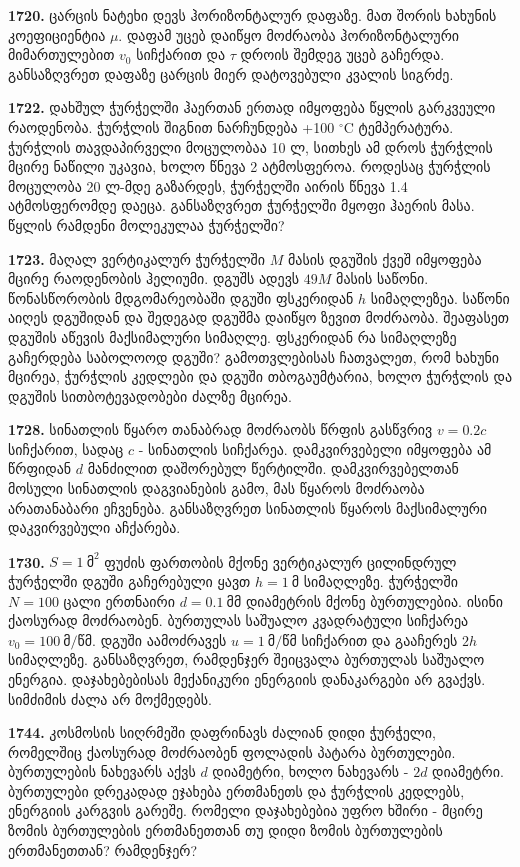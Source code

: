 \documentclass[12pt,a4paper,]{report}
\begin{document}
\textbf{1720.} ცარცის ნატეხი დევს ჰორიზონტალურ დაფაზე. მათ შორის ხახუნის კოეფიციენტია $\mu$. დაფამ უცებ დაიწყო მოძრაობა ჰორიზონტალური მიმართულებით $v_0$ სიჩქარით და $\tau$ დროის შემდეგ უცებ გაჩერდა. განსაზღვრეთ დაფაზე ცარცის მიერ დატოვებული კვალის სიგრძე.

\textbf{1722.} დახშულ ჭურჭელში ჰაერთან ერთად იმყოფება წყლის გარკვეული რაოდენობა. ჭურჭლის შიგნით ნარჩუნდება +100 $^{\circ}$C ტემპერატურა. ჭურჭლის თავდაპირველი მოცულობაა 10 ლ, სითხეს ამ დროს ჭურჭლის მცირე ნაწილი უკავია, ხოლო წნევა 2 ატმოსფეროა. როდესაც ჭურჭლის მოცულობა 20 ლ-მდე გაზარდეს, ჭურჭელში აირის წნევა 1.4 ატმოსფერომდე დაეცა. განსაზღვრეთ ჭურჭელში მყოფი ჰაერის მასა. წყლის რამდენი მოლეკულაა ჭურჭელში?

\textbf{1723.} მაღალ ვერტიკალურ ჭურჭელში $M$ მასის დგუშის ქვეშ იმყოფება მცირე რაოდენობის ჰელიუმი. დგუშს ადევს $49M$ მასის საწონი. წონასწორობის მდგომარეობაში დგუში ფსკერიდან $h$ სიმაღლეზეა. საწონი აიღეს დგუშიდან და შედეგად დგუშმა დაიწყო ზევით მოძრაობა. შეაფასეთ დგუშის აწევის მაქსიმალური სიმაღლე. ფსკერიდან რა სიმაღლეზე გაჩერდება საბოლოოდ დგუში? გამოთვლებისას ჩათვალეთ, რომ ხახუნი მცირეა, ჭურჭლის კედლები და დგუში თბოგაუმტარია, ხოლო ჭურჭლის და დგუშის სითბოტევადობები ძალზე მცირეა.

\textbf{1728.} სინათლის წყარო თანაბრად მოძრაობს წრფის გასწვრივ $v=0.2c$ სიჩქარით, სადაც $c$ - სინათლის სიჩქარეა. დამკვირვებელი იმყოფება ამ წრფიდან $d$ მანძილით დაშორებულ წერტილში. დამკვირვებელთან მოსული სინათლის დაგვიანების გამო, მას წყაროს მოძრაობა არათანაბარი ეჩვენება. განსაზღვრეთ სინათლის წყაროს მაქსიმალური დაკვირვებული აჩქარება.   

\textbf{1730.} $S = 1\ \text{მ}^2$ ფუძის ფართობის მქონე ვერტიკალურ ცილინდრულ ჭურჭელში დგუში გაჩერებული ყავთ $h = 1\ \text{მ}$ სიმაღლეზე. ჭურჭელში $N = 100$ ცალი ერთნაირი $d = 0.1\ \text{მმ}$ დიამეტრის მქონე ბურთულებია. ისინი ქაოსურად მოძრაობენ. ბურთულას საშუალო კვადრატული სიჩქარეა $v_0 = 100\ \text{მ/წმ}$. დგუში აამოძრავეს $u = 1\ \text{მ/წმ}$ სიჩქარით და გააჩერეს $2h$ სიმაღლეზე. განსაზღვრეთ, რამდენჯერ შეიცვალა ბურთულას საშუალო ენერგია. დაჯახებებისას მექანიკური ენერგიის დანაკარგები არ გვაქვს. სიმძიმის ძალა არ მოქმედებს.

\textbf{1744.} კოსმოსის სიღრმეში დაფრინავს ძალიან დიდი ჭურჭელი, რომელშიც ქაოსურად მოძრაობენ ფოლადის პატარა ბურთულები. ბურთულების ნახევარს აქვს $d$ დიამეტრი, ხოლო ნახევარს - $2d$ დიამეტრი. ბურთულები დრეკადად ეჯახება ერთმანეთს და ჭურჭლის კედლებს, ენერგიის კარგვის გარეშე. რომელი დაჯახებებია უფრო ხშირი - მცირე ზომის ბურთულების ერთმანეთთან თუ დიდი ზომის ბურთულების ერთმანეთთან? რამდენჯერ?                      
\end{document}
